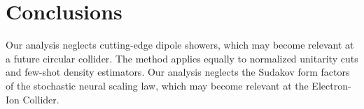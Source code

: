 \section{Conclusions}\label{sec:conclusions}

Our analysis neglects cutting-edge dipole showers, which may become
relevant at a future circular collider. The method applies equally to
normalized unitarity cuts and few-shot density estimators. Our analysis
neglects the Sudakov form factors of the stochastic neural scaling law,
which may become relevant at the Electron-Ion Collider.

